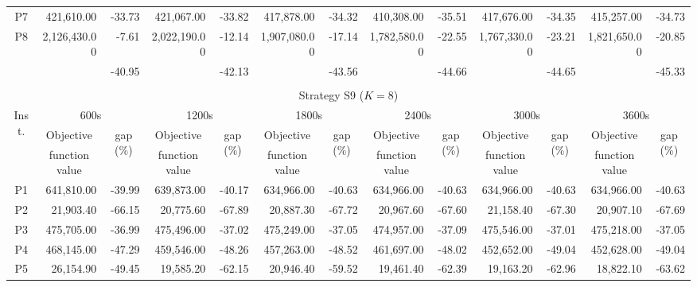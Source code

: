\documentclass[11pt]{article}
\begin{document}
\begin{table}[ht!]
\begin{center}
{\begin{tabular}{|c|rr|rr|rr|rr|rr|rr|}
P7 & 421,610.00 & -33.73 & 421,067.00 & -33.82 & 417,878.00 & -34.32 & 410,308.00 & -35.51 & 417,676.00 & -34.35 & 415,257.00 & -34.73\\
P8 & 2,126,430.00 & -7.61 & 2,022,190.00 & -12.14 & 1,907,080.00 & -17.14 & 1,782,580.00 & -22.55 & 1,767,330.00 & -23.21 & 1,821,650.00 & -20.85\\ 
\hline
&    & -40.95 &    & -42.13 &    & -43.56 &    & -44.66 &    & -44.65 &    & -45.33\\
\hline
\multicolumn{13}{c}{}\\
\hline
\multicolumn{13}{|c|}{Strategy S9 ($K = 8$)}\\
\hline
\multirow{3}{*}{Inst.} &  
\multicolumn{2}{c|}{600s} &  
\multicolumn{2}{c|}{1200s} & 
\multicolumn{2}{c|}{1800s} & 
\multicolumn{2}{c|}{2400s} & 
\multicolumn{2}{c|}{3000s} & 
\multicolumn{2}{c|}{3600s}\\ 
\cline{2-13}
& \multicolumn{1}{c}{Objective} & \multicolumn{1}{c|}{\multirow{2}{*}{gap (\%)}} 
& \multicolumn{1}{c}{Objective} & \multicolumn{1}{c|}{\multirow{2}{*}{gap (\%)}} 
& \multicolumn{1}{c}{Objective} & \multicolumn{1}{c|}{\multirow{2}{*}{gap (\%)}} 
& \multicolumn{1}{c}{Objective} & \multicolumn{1}{c|}{\multirow{2}{*}{gap (\%)}} 
& \multicolumn{1}{c}{Objective} & \multicolumn{1}{c|}{\multirow{2}{*}{gap (\%)}} 
& \multicolumn{1}{c}{Objective} & \multicolumn{1}{c|}{\multirow{2}{*}{gap (\%)}} \\
& \multicolumn{1}{c}{function value} &
& \multicolumn{1}{c}{function value} &
& \multicolumn{1}{c}{function value} &
& \multicolumn{1}{c}{function value} &
& \multicolumn{1}{c}{function value} &
& \multicolumn{1}{c}{function value} &\\
\hline
\hline
P1 & 641,810.00 & -39.99 & 639,873.00 & -40.17 & 634,966.00 & -40.63 & 634,966.00 & -40.63 & 634,966.00 & -40.63 & 634,966.00 & -40.63\\
P2  & 21,903.40 & -66.15 & 20,775.60 & -67.89 & 20,887.30 & -67.72 & 20,967.60 & -67.60 & 21,158.40 & -67.30 & 20,907.10 & -67.69\\
P3 & 475,705.00 & -36.99 & 475,496.00 & -37.02 & 475,249.00 & -37.05 & 474,957.00 & -37.09 & 475,546.00 & -37.01 & 475,218.00 & -37.05\\
P4 & 468,145.00 & -47.29 & 459,546.00 & -48.26 & 457,263.00 & -48.52 & 461,697.00 & -48.02 & 452,652.00 & -49.04 & 452,628.00 & -49.04\\
P5 & 26,154.90 & -49.45 & 19,585.20 & -62.15 & 20,946.40 & -59.52 & 19,461.40 & -62.39 & 19,163.20 & -62.96 & 18,822.10 & -63.62\\

\end{tabular}}
\end{center}
\end{table}
\end{document}
